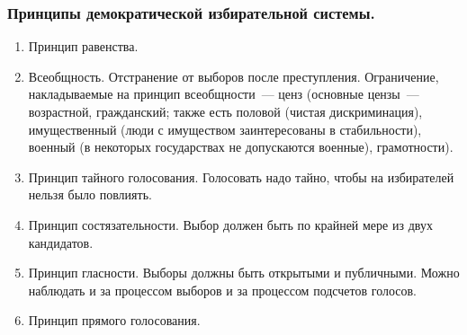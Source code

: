 \documentclass[12pt]{article}
\begin{document}
	\subsubsection{Принципы демократической избирательной системы.}
	\begin{enumerate}
		\item Принцип равенства.
		\item Всеобщность. Отстранение от выборов после преступления. Ограничение, накладываемые на принцип всеобщности~--- ценз (основные цензы~--- возрастной, гражданский; также есть половой (чистая дискриминация), имущественный (люди с имуществом заинтересованы в стабильности), военный (в некоторых государствах не допускаются военные), грамотности).
		\item Принцип тайного голосования. Голосовать надо тайно, чтобы на избирателей нельзя было повлиять.
		\item Принцип состязательности. Выбор должен быть по крайней мере из двух кандидатов.
		\item Принцип гласности. Выборы должны быть открытыми и публичными. Можно наблюдать и за процессом выборов и за процессом подсчетов голосов.
		\item Принцип прямого голосования.
	\end{enumerate}
\end{document}
